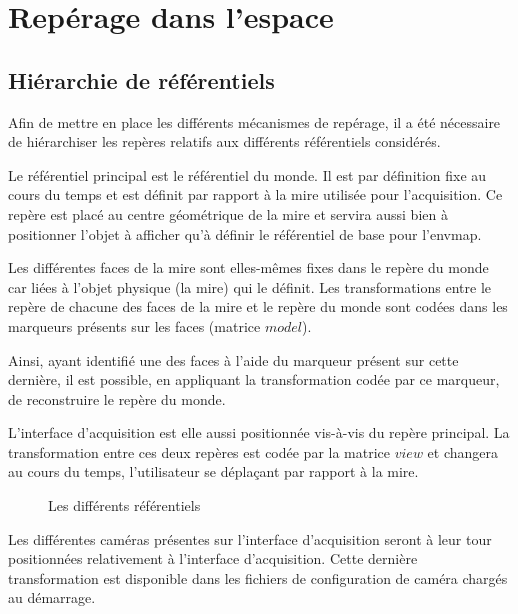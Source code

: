 \documentclass[10pt,a4paper,twoside, twocolumn]{report}
\newcommand*{\rootPath}{../}
\begin{document}
\iftwocolumn \twocolumn \else \onecolumn \fi


\chapter{Repérage dans l’espace}

\section{Hiérarchie de référentiels}

Afin de mettre en place les différents mécanismes de repérage, il a été nécessaire de hiérarchiser les repères relatifs aux différents référentiels considérés.

Le référentiel principal est le référentiel du monde. Il est par définition fixe au cours du temps et est définit par rapport à la mire utilisée pour l’acquisition. Ce repère est placé au centre géométrique de la mire et servira aussi bien à positionner l’objet à afficher qu’à définir le référentiel de base pour l’envmap.

Les différentes faces de la mire sont elles-mêmes fixes dans le repère du monde car liées à l’objet physique (la mire) qui le définit. Les transformations entre le repère de chacune des faces de la mire et le repère du monde sont codées dans les marqueurs présents sur les faces (matrice $model$).

Ainsi, ayant identifié une des faces à l’aide du marqueur présent sur cette dernière, il est possible, en appliquant la transformation codée par ce marqueur, de reconstruire le repère du monde.

L’interface d’acquisition est elle aussi positionnée vis-à-vis du repère principal. La transformation entre ces deux repères est codée par la matrice $view$ et changera au cours du temps, l’utilisateur se déplaçant par rapport à la mire.

\begin{figure}[!ht]
	\centering
	
	\caption{Les différents référentiels}
	\label{fig:tikz:spaceHierarchie}
\end{figure}

Les différentes caméras présentes sur l’interface d’acquisition seront à leur tour positionnées relativement à l’interface d’acquisition. Cette dernière transformation est disponible dans les fichiers de configuration de caméra chargés au démarrage.
\end{document}
